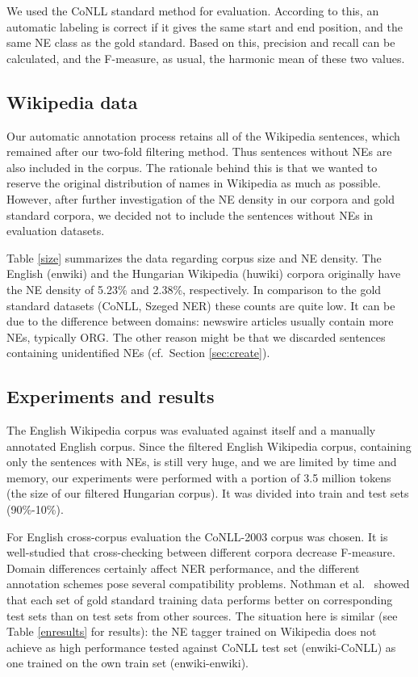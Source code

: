 \documentclass[11pt]{article}
\begin{document}
We used the CoNLL standard method for evaluation. According to this, an automatic labeling is correct if it gives the same start and end position, and the same NE class as the gold standard. Based on this, precision and recall can be calculated, and the F-measure, as usual, the harmonic mean of these two values.  

\subsection{Wikipedia data}

Our automatic annotation process retains all of the Wikipedia sentences, which remained after our two-fold filtering method. Thus sentences without NEs are also included in the corpus. The rationale behind this is that we wanted to reserve the original distribution of names in Wikipedia as much as possible. However, after further investigation of the NE density in our corpora and gold standard corpora, we decided not to include the sentences without NEs in evaluation datasets. 

Table \ref{size} summarizes the data regarding corpus size and NE density. The English (enwiki) and the Hungarian Wikipedia (huwiki) corpora originally have the NE density of 5.23\% and 2.38\%, respectively. In comparison to the gold standard datasets (CoNLL, Szeged NER) these counts are quite low. It can be due to the difference between domains: newswire articles usually contain more NEs, typically ORG. The other reason might be that we discarded sentences containing unidentified NEs (cf.~Section \ref{sec:create}).    

\subsection{Experiments and results}

The English Wikipedia corpus was evaluated against itself and a manually annotated English corpus. Since the filtered English Wikipedia corpus, containing only the sentences with NEs, is still very huge, and we are limited by time and memory, our experiments were performed with a portion of 3.5 million tokens (the size of our filtered Hungarian corpus). It was divided into train and test sets (90\%-10\%). 

For English cross-corpus evaluation the CoNLL-2003 corpus was chosen. It is well-studied that cross-checking between different corpora decrease F-measure. Domain differences certainly affect NER performance, and the different annotation schemes pose several compatibility problems. Nothman et al.~ showed that each set of gold standard training data performs better on corresponding test sets than on test sets from other sources. The situation here is similar (see Table \ref{enresults} for results): the NE tagger trained on Wikipedia does not achieve as high performance tested against CoNLL test set (enwiki-CoNLL) as one trained on the own train set (enwiki-enwiki). 
\end{document}
